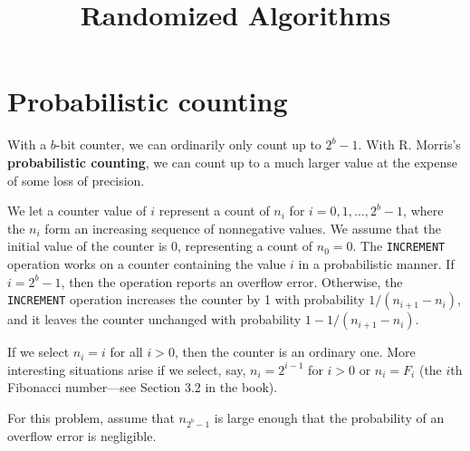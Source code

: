 \documentclass{article}
\begin{document}
\title{Randomized Algorithms}
\date{}
\maketitle
\setcounter{section}{0}

\section{Probabilistic counting}
With a $b$-bit counter, we can ordinarily only count up to $2^b-1$. With R. Morris's \textbf{probabilistic counting}, we can count up to a much larger value at the expense of some loss of precision.

We let a counter value of $i$ represent a count of $n_i$ for $i=0, 1, ...,2^b-1$, where the $n_i$ form an increasing sequence of nonnegative values. We assume that the initial value of the counter is 0, representing a count of $n_0=0$. The \texttt{INCREMENT} operation works on a counter containing the value $i$ in a probabilistic manner. If $i=2^b-1$, then the operation reports an overflow error. Otherwise, the \texttt{INCREMENT} operation increases the counter by 1 with probability $1/(n_{i+1}-n_i)$, and it leaves the counter unchanged with probability $1-1/(n_{i+1}-n_i)$.

If we select $n_i=i$ for all $i>0$, then the counter is an ordinary one. More interesting situations arise if we select, say, $n_i=2^{i-1}$ for $i>0$ or $n_i=F_i$ (the $i$th Fibonacci number---see Section 3.2 in the book).

For this problem, assume that $n_{2^b-1}$ is large enough that the probability of an overflow error is negligible.
\end{document}
